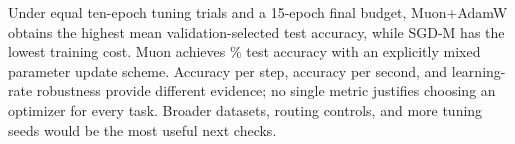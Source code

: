 Under equal ten-epoch tuning trials and a 15-epoch final budget, Muon+AdamW obtains the highest mean validation-selected test accuracy, while SGD-M has the lowest training cost. Muon achieves \% test accuracy with an explicitly mixed parameter update scheme. Accuracy per step, accuracy per second, and learning-rate robustness provide different evidence; no single metric justifies choosing an optimizer for every task. Broader datasets, routing controls, and more tuning seeds would be the most useful next checks.

